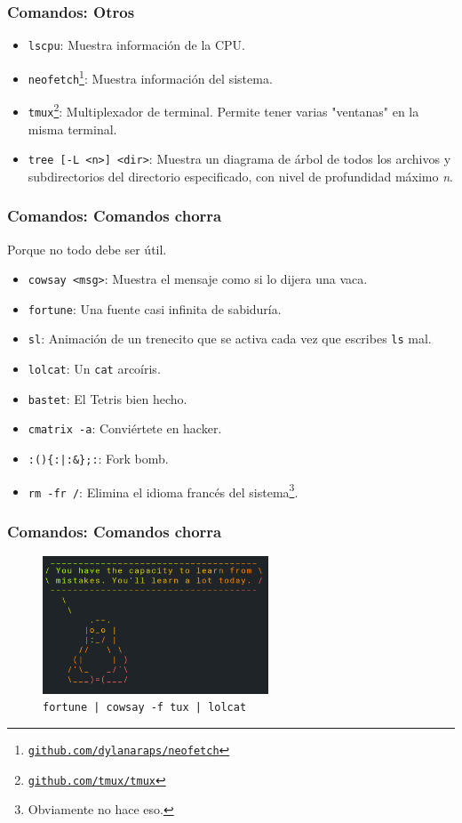 \documentclass[aspectratio=43]{beamer}
\begin{document}
\begin{frame}
    \frametitle{Comandos: Otros}

    \begin{itemize}
        \item \texttt{lscpu}: Muestra información de la CPU.
        \item \texttt{neofetch\footnote{\href{https://github.com/dylanaraps/neofetch}{github.com/dylanaraps/neofetch}}}: Muestra información del sistema.
        \item \texttt{tmux\footnote{\href{https://github.com/tmux/tmux}{github.com/tmux/tmux}}}: Multiplexador de terminal. Permite tener varias "ventanas" en la misma terminal.
        \item \texttt{tree [-L <n>] <dir>}: Muestra un diagrama de árbol de todos los archivos y subdirectorios del directorio especificado, con nivel de profundidad máximo \textit{n}.
    \end{itemize}

\end{frame}

\begin{frame}
    \frametitle{Comandos: Comandos chorra}
    Porque no todo debe ser útil.

    \begin{itemize}
        \item \texttt{cowsay <msg>}: Muestra el mensaje como si lo dijera una vaca.
        \item \texttt{fortune}: Una fuente casi infinita de sabiduría.
        \item \texttt{sl}: Animación de un trenecito que se activa cada vez que escribes \texttt{ls} mal.
        \item \texttt{lolcat}: Un \texttt{cat} arcoíris.
        \item \texttt{bastet}: El Tetris bien hecho.
        \item \texttt{cmatrix -a}: Conviértete en hacker.
        \item \texttt{:()\{:|:\&\};:}: Fork bomb.
        \item \texttt{rm -fr /}: Elimina el idioma francés del sistema\footnote{Obviamente no hace eso.}.
    \end{itemize}

\end{frame}

\begin{frame}
    \frametitle{Comandos: Comandos chorra}
    \begin{figure}
        \centering
        \includegraphics[width=0.6\textwidth]{img/wisdom.png}
        \caption{\texttt{fortune | cowsay -f tux | lolcat}}
    \end{figure}
\end{frame}
\end{document}

